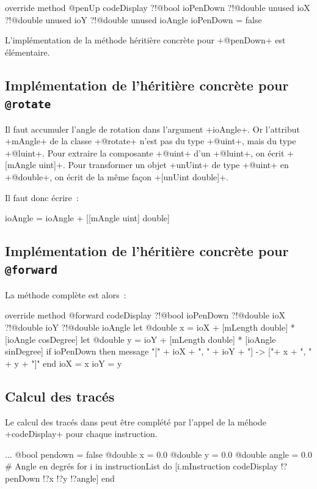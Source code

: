 \begin{galgas3}
override method @penUp codeDisplay
  ?!@bool ioPenDown
  ?!@double unused ioX
  ?!@double unused ioY
  ?!@double unused ioAngle
{
  ioPenDown = false
}
\end{galgas3}

L'implémentation de la méthode héritière concrète pour \ggst+@penDown+ est élémentaire.

\subsection{Implémentation de l'héritière concrète pour \texttt{@rotate}}
Il faut accumuler l'angle de rotation dans l'argument \ggst+ioAngle+. Or l'attribut \ggst+mAngle+ de la classe \ggst+@rotate+ n'est pas du type \ggst+@uint+, mais du type \ggst+@luint+. Pour extraire la composante \ggst+@uint+ d’un \ggst+@luint+, on écrit \ggst+[mAngle uint]+. Pour transformer un objet \ggst+unUint+ de type \ggst+@uint+ en \ggst+@double+, on écrit de la même façon \ggst+[unUint double]+.


 Il faut donc écrire~:
\begin{galgas3}
ioAngle = ioAngle + [[mAngle uint] double]
\end{galgas3}

\subsection{Implémentation de l'héritière concrète pour \texttt{@forward}}
La méthode complète est alors~:

\begin{galgas3}
override method @forward codeDisplay
  ?!@bool ioPenDown
  ?!@double ioX
  ?!@double ioY
  ?!@double ioAngle
{
  let @double x = ioX + [mLength double] * [ioAngle cosDegree]
  let @double y = ioY + [mLength double] * [ioAngle sinDegree]
  if ioPenDown then
    message "[" + ioX + ", " + ioY + "] -> ["+ x + ", " + y + "]\n"
  end
  ioX = x
  ioY = y
}
\end{galgas3}

\subsection{Calcul des tracés}
Le calcul des tracés dans  peut être complété par l'appel de la méhode \ggst+codeDisplay+ pour chaque instruction.
\begin{galgas3}
  ...
  @bool pendown = false
  @double x = 0.0
  @double y = 0.0
  @double angle = 0.0 # Angle en degrés
  for i in instructionList do
    [i.mInstruction codeDisplay !?penDown !?x !?y !?angle]
  end
\end{galgas3}

